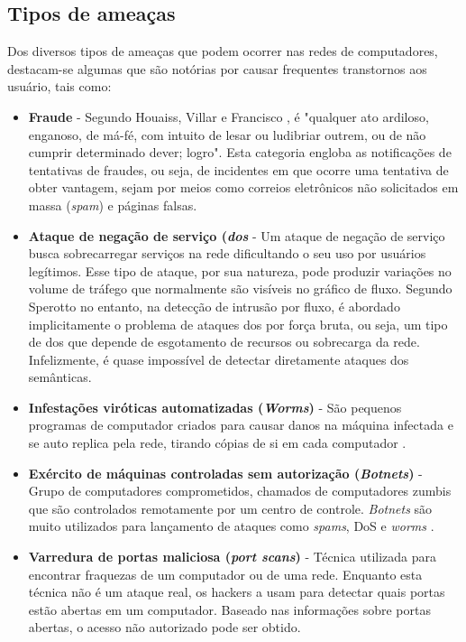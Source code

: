 \subsection{Tipos de ameaças}
Dos diversos tipos de ameaças que podem ocorrer nas redes de computadores, destacam-se algumas que são notórias por causar frequentes transtornos aos usuário, tais como:
\begin{itemize}
\item \textbf{Fraude} - Segundo Houaiss, Villar e Francisco \cite{Houaiss:2001}, é "qualquer ato ardiloso, enganoso, de má-fé, com intuito de lesar ou ludibriar outrem, ou de não cumprir determinado dever; logro". Esta categoria engloba as notificações de tentativas de fraudes, ou seja, de incidentes em que ocorre uma tentativa de obter vantagem, sejam por meios como correios eletrônicos não solicitados em massa (\textit{spam}) e páginas falsas.
    
\item \textbf{Ataque de negação de serviço (\textit{\gls{dos}}} - Um ataque de negação de serviço busca sobrecarregar serviços na rede dificultando o seu uso por usuários legítimos. Esse tipo de ataque, por sua natureza, pode produzir variações no volume de tráfego que normalmente são visíveis no gráfico de fluxo. Segundo Sperotto  \cite{Sperotto:2010} no entanto, na detecção de intrusão por fluxo, é abordado implicitamente o problema de ataques \gls{dos} por força bruta, ou seja, um tipo de \gls{dos} que depende de esgotamento de recursos ou sobrecarga da rede. Infelizmente, é quase impossível de detectar diretamente ataques \gls{dos} semânticas.
    
\item \textbf{Infestações viróticas automatizadas (\textit{Worms})} - São pequenos programas de computador criados para causar danos na máquina infectada e se auto replica pela rede, tirando cópias de si em cada computador \cite{Sperotto:2010}.
    
\item \textbf{Exército de máquinas controladas sem autorização (\textit{Botnets})} - Grupo de computadores comprometidos, chamados de computadores zumbis que são controlados remotamente por um centro de controle. \textit{Botnets} são muito utilizados para lançamento de ataques  como \textit{spams}, DoS e \textit{worms} \cite{Sperotto:2010}.
    
\item \textbf{Varredura de portas maliciosa (\textit{port scans})} - Técnica utilizada para encontrar fraquezas de um computador ou de uma rede. Enquanto esta técnica não é um ataque real, os hackers a usam para detectar quais portas estão abertas em um computador. Baseado nas informações sobre portas abertas, o acesso não autorizado pode ser obtido.
\end{itemize}

